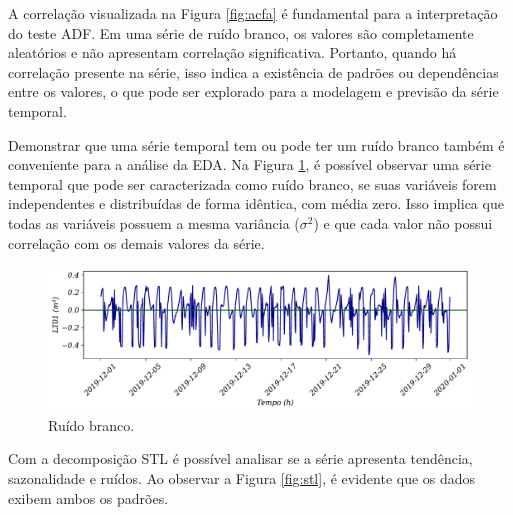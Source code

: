 %
%
%

A correlação visualizada na Figura \ref{fig:acfa} é fundamental para a interpretação do teste ADF. Em uma série de ruído branco, os valores são completamente aleatórios e não apresentam correlação significativa. Portanto, quando há correlação presente na série, isso indica a existência de padrões ou dependências entre os valores, o que pode ser explorado para a modelagem e previsão da série temporal.

Demonstrar que uma série temporal tem ou pode ter um ruído branco também é conveniente para a análise da EDA.
Na Figura \ref{fig:ruido-branco}, é possível observar uma série temporal que pode ser caracterizada como ruído branco, se suas variáveis forem independentes e distribuídas de forma idêntica, com média zero. Isso implica que todas as variáveis possuem a mesma variância ($\sigma^2$) e que cada valor não possui correlação com os demais valores da série.

\begin{figure}[!htb]
	\centering
	\caption{Ruído branco.}
	\label{fig:ruido-branco}
	\includegraphics[width=\linewidth]{Resultados/Figuras/ruido-branco}
\end{figure}

Com a decomposição STL é possível analisar se a série apresenta tendência, sazonalidade e ruídos. Ao observar a Figura \ref{fig:stl}, é evidente que os dados exibem ambos os padrões. 

